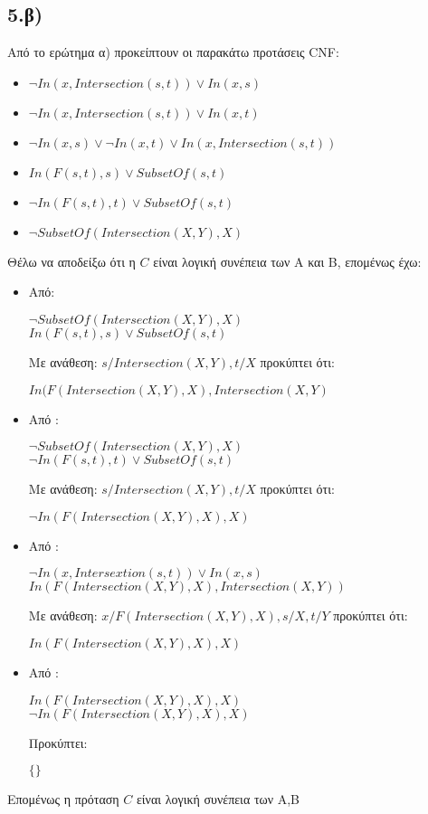 \documentclass[12pt,a4paper]{article}
\begin{document}
\subsection*{5.β)}
Από το ερώτημα α) προκείπτουν οι παρακάτω προτάσεις \textlatin{CNF}:
\begin{itemize}
\item$\neg In(x,Intersection(s,t))\vee In(x,s)$
\item$\neg In(x,Intersection(s,t))\vee In(x,t)$
\item$\neg In(x,s)\vee\neg In(x,t)\vee In(x,Intersection(s,t))$
\item$In(F(s,t),s)\vee SubsetOf(s,t)$
\item$\neg In(F(s,t),t)\vee SubsetOf(s,t)$
\item$\neg SubsetOf(Intersection(X,Y),X)$
\end{itemize}
Θέλω να αποδείξω ότι η $C$ είναι λογική συνέπεια των Α και Β, επομένως έχω:\begin{itemize}
\item Από:\begin{center}
$\neg SubsetOf(Intersection(X,Y),X)$\\
$In(F(s,t),s)\vee SubsetOf(s,t)$
\end{center}
Με ανάθεση: $s/Intersection(X,Y),t/X$ προκύπτει ότι:\begin{center}
$In(F(Intersection(X,Y),X),Intersection(X,Y) $
\end{center}
\item Από :\begin{center}
$\neg SubsetOf(Intersection(X,Y),X)$\\
$\neg In(F(s,t),t)\vee SubsetOf(s,t)$
\end{center}
Με ανάθεση: $s/Intersection(X,Y),t/X $ προκύπτει ότι: \begin{center}
$\neg In(F(Intersection(X,Y),X),X)$
\end{center}
\item Από :\begin{center}
$\neg In(x,Intersextion(s,t))\vee In(x,s)$\\
$In(F(Intersection(X,Y),X),Intersection(X,Y))$
\end{center}
Με ανάθεση: $x/F(Intersection(X,Y),X),s/X,t/Y$ προκύπτει ότι: \begin{center}
$In(F(Intersection(X,Y),X),X)$\end{center}
\item Από :\begin{center}
$In(F(Intersection(X,Y),X),X)$\\
$\neg In(F(Intersection(X,Y),X),X)$
\end{center}
Προκύπτει: \begin{center}
$\{ \}$
\end{center}
\end{itemize}
Επομένως η πρόταση $C$ είναι λογική συνέπεια των Α,Β
\end{document}
